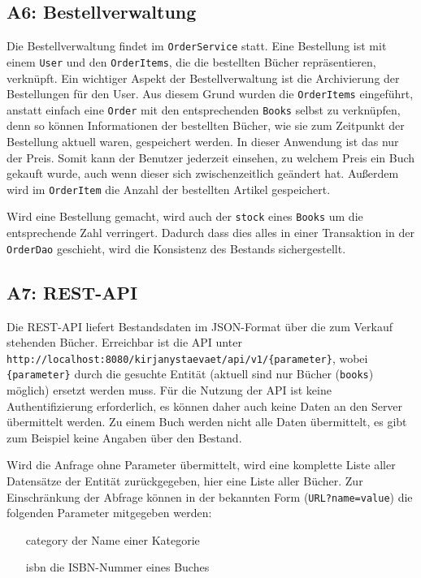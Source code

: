 	\subsection{A6: Bestellverwaltung}\label{sec:umsetzung:Bestellverwaltung}
	Die Bestellverwaltung findet im \texttt{OrderService} statt. Eine Bestellung ist mit einem \texttt{User} und den \texttt{OrderItems}, die die bestellten Bücher repräsentieren, verknüpft. Ein wichtiger Aspekt der Bestellverwaltung ist die Archivierung der Bestellungen für den User. Aus diesem Grund wurden die \texttt{OrderItems} eingeführt, anstatt einfach eine \texttt{Order} mit den entsprechenden \texttt{Books} selbst zu verknüpfen, denn so können Informationen der bestellten Bücher, wie sie zum Zeitpunkt der Bestellung aktuell waren, gespeichert werden. In dieser Anwendung ist das nur der Preis. Somit kann der Benutzer jederzeit einsehen, zu welchem Preis ein Buch gekauft wurde, auch wenn dieser sich zwischenzeitlich geändert hat. Außerdem wird im \texttt{OrderItem} die Anzahl der bestellten Artikel gespeichert.
	
	Wird eine Bestellung gemacht, wird auch der \texttt{stock} eines \texttt{Books} um die entsprechende Zahl verringert. Dadurch dass dies alles in einer Transaktion in der \texttt{OrderDao} geschieht, wird die Konsistenz des Bestands sichergestellt.
	
	
	\subsection{A7: REST-API}\label{sec:umsetzung:API}
	Die REST-API liefert Bestandsdaten im JSON-Format über die zum Verkauf stehenden Bücher. Erreichbar ist die API unter \lstinline|http://localhost:8080/kirjanystaevaet/api/v1/{parameter}|, wobei \lstinline|{parameter}| durch die gesuchte Entität (aktuell sind nur Bücher (\lstinline|books|) möglich) ersetzt werden muss. Für die Nutzung der API ist keine Authentifizierung erforderlich, es können daher auch keine Daten an den Server übermittelt werden. Zu einem Buch werden nicht alle Daten übermittelt, es gibt zum Beispiel keine Angaben über den Bestand.
	
	Wird die Anfrage ohne Parameter übermittelt, wird eine komplette Liste aller Datensätze der Entität zurückgegeben, hier eine Liste aller Bücher. Zur Einschränkung der Abfrage können in der bekannten Form (\lstinline|URL?name=value|) die folgenden Parameter mitgegeben werden:
	\begin{itemize}
		\item[category] der Name einer Kategorie
		\item[isbn] die ISBN-Nummer eines Buches
	\end{itemize}
	
